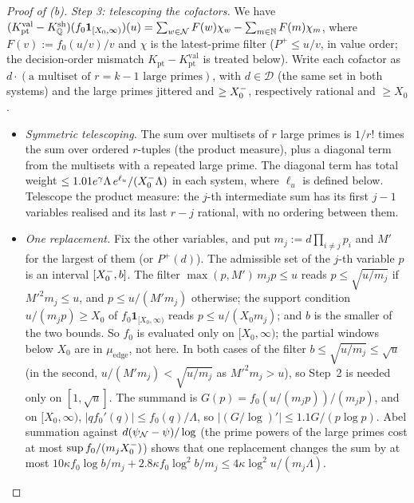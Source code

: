 \begin{proof}[Proof of (b)]
\emph{Step 3: telescoping the cofactors.} We have
$(K^{\mathrm{val}}_{\mathrm{pt}}-K^{\mathrm{sh}}_{\mathbb Q})(f_0\mathbf 1_{[X_0,\infty)})(u)=\sum_{w\in\mathcal{N}}F(w)\chi_w-\sum_{m\in\mathbb{N}}F(m)\chi_m$,
where $F(v):=f_0(u/v)/v$ and $\chi$ is the latest-prime filter ($P^+\le u/v$, in value order; the decision-order mismatch
$K_{\mathrm{pt}}-K^{\mathrm{val}}_{\mathrm{pt}}$ is treated below). Write each cofactor as
$d\cdot(\text{a multiset of }r=k-1\text{ large primes})$, with $d\in\mathcal D$ (the same set in both systems) and the large primes
jittered and $\ge X_0^{-}$, respectively rational and $\ge X_0$.
\begin{itemize}
\item \emph{Symmetric telescoping.} The sum over multisets of $r$ large primes is $1/r!$ times the sum over ordered $r$-tuples (the
product measure), plus a diagonal term from the multisets with a repeated large prime. The diagonal term has total weight
$\le1.01e^{\gamma}\Lambda\,e^{\ell_u}/(X_0^{-}\Lambda)$ in each system, where $\ell_u$ is defined below. Telescope the product measure: the
$j$-th intermediate sum has its first $j-1$ variables realised and its last $r-j$ rational, with no ordering between them.
\item \emph{One replacement.} Fix the other variables, and put $m_j:=d\prod_{i\ne j}p_i$ and $M'$ for the largest of them (or $P^+(d)$).
The admissible set of the $j$-th variable $p$ is an interval $[X_0^{-},b]$. The filter $\max(p,M')\,m_jp\le u$ reads
$p\le\sqrt{u/m_j}$ if $M'^2m_j\le u$, and $p\le u/(M'm_j)$ otherwise; the support condition $u/(m_jp)\ge X_0$ of
$f_0\mathbf 1_{[X_0,\infty)}$ reads $p\le u/(X_0m_j)$; and $b$ is the smaller of the two bounds. So $f_0$ is evaluated only on
$[X_0,\infty)$; the partial windows below $X_0$ are in $\mu_{\mathrm{edge}}$, not here. In both cases of the filter
$b\le\sqrt{u/m_j}\le\sqrt u$ (in the second, $u/(M'm_j)<\sqrt{u/m_j}$ as $M'^2m_j>u$), so Step~2 is needed only on
$[1,\sqrt u]$. The summand is $G(p)=f_0(u/(m_jp))/(m_jp)$, and on $[X_0,\infty)$, $|qf_0'(q)|\le f_0(q)/\Lambda$, so
$|(G/\log)'|\le1.1G/(p\log p)$. Abel summation against
$d(\psi_{\mathcal{N}}-\psi)/\log$ (the prime powers of the large primes cost at most $\sup f_0/(m_jX_0^{-})$) shows that one replacement changes the sum by at most
$10\kappa f_0\log b/m_j+2.8\kappa f_0\log^2b/m_j\le4\kappa\log^2u/(m_j\Lambda)$.

\end{itemize}
\end{proof}
